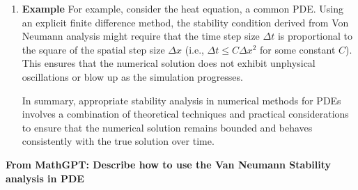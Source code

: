 \documentclass[10pt,a4paper]{report}
\begin{document}
\begin{enumerate}
\item \textbf{Example}
For example, consider the heat equation, a common PDE. Using an explicit finite difference method, the stability condition derived from Von Neumann analysis might require that the time step size \(\Delta t\) is proportional to the square of the spatial step size \(\Delta x\) (i.e., \(\Delta t \leq C \Delta x^2\) for some constant \(C\)). This ensures that the numerical solution does not exhibit unphysical oscillations or blow up as the simulation progresses.

In summary, appropriate stability analysis in numerical methods for PDEs involves a combination of theoretical techniques and practical considerations to ensure that the numerical solution remains bounded and behaves consistently with the true solution over time.

\end{enumerate}

\newpage
\textbf{\Large{From MathGPT: Describe how to use the Van Neumann Stability analysis in PDE}}\\
\end{document}
